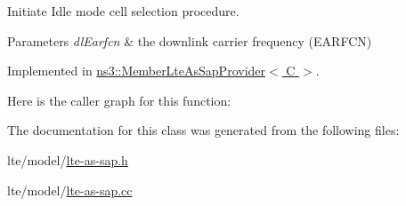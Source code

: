 Initiate Idle mode cell selection procedure. 


\begin{DoxyParams}{Parameters}
{\em dl\+Earfcn} & the downlink carrier frequency (E\+A\+R\+F\+CN) \\
\hline
\end{DoxyParams}


Implemented in \hyperlink{classns3_1_1MemberLteAsSapProvider_a80b3ef90b9ebbe48800db92327d79caa}{ns3\+::\+Member\+Lte\+As\+Sap\+Provider$<$ C $>$}.



Here is the caller graph for this function\+:




The documentation for this class was generated from the following files\+:\begin{DoxyCompactItemize}
\item 
lte/model/\hyperlink{lte-as-sap_8h}{lte-\/as-\/sap.\+h}\item 
lte/model/\hyperlink{lte-as-sap_8cc}{lte-\/as-\/sap.\+cc}\end{DoxyCompactItemize}
